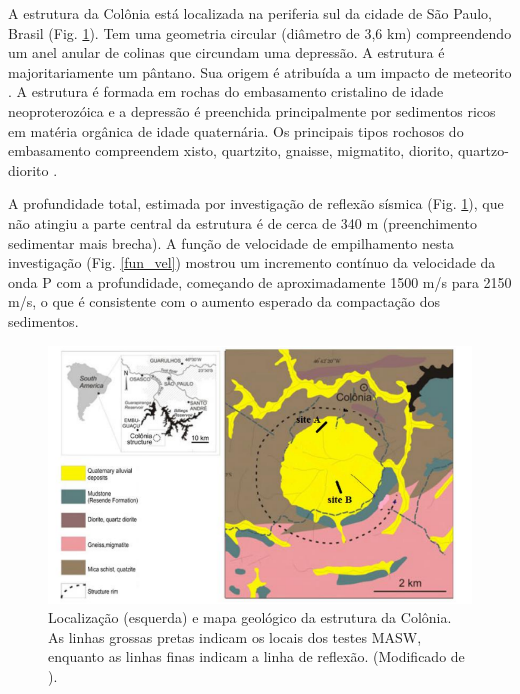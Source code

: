 \documentclass[smallextended]{svjour3}       %
\begin{document}
A estrutura da Colônia está localizada na periferia sul da cidade de São Paulo, Brasil (Fig. \ref{geologia}). Tem uma geometria circular (diâmetro de 3,6 km) compreendendo um anel anular de colinas que circundam uma depressão. A estrutura é majoritariamente um pântano. Sua origem é atribuída a um impacto de meteorito \citep{riccomini1989colonia}. A estrutura é formada em rochas do embasamento cristalino de idade neoproterozóica e a depressão é preenchida principalmente por sedimentos ricos em matéria orgânica de idade quaternária. Os principais tipos rochosos do embasamento compreendem xisto, quartzito, gnaisse, migmatito, diorito, quartzo-diorito \citep{sadowski1974tectonica}.

A profundidade total, estimada por investigação de reflexão sísmica (Fig. \ref{geologia}), que não atingiu a parte central da estrutura \citep{riccomini2011colonia} é de cerca de 340 m (preenchimento sedimentar mais brecha). A função de velocidade de empilhamento nesta investigação (Fig. \ref{fun_vel}) mostrou um incremento contínuo da velocidade da onda P com a profundidade, começando de aproximadamente 1500 m/s para 2150 m/s, o que é consistente com o aumento esperado da compactação dos sedimentos.

\begin{figure}[!hbtp]
  \begin{center}
  
  \includegraphics[scale=0.8]{Figures/fig1.png}
  \end{center}
  \caption{Localização (esquerda) e mapa geológico da estrutura da Colônia. As linhas grossas pretas indicam os locais dos testes MASW, enquanto as linhas finas indicam a linha de reflexão. (Modificado de \citealp{riccomini2011colonia}).
  }
  \label{geologia}
\end{figure}
\end{document}
